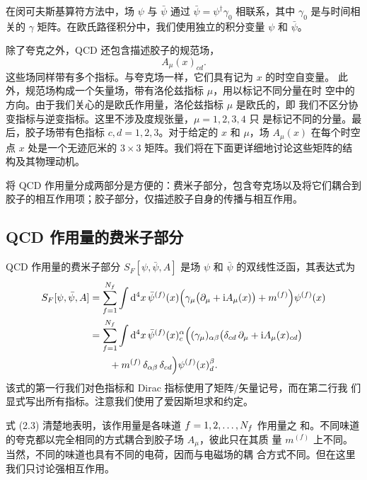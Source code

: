 在闵可夫斯基算符方法中，场 $\psi$ 与 $\bar\psi$ 通过
$\bar\psi = \psi^\dagger \gamma_0$ 相联系，其中 $\gamma_0$ 是与时间相关的
$\gamma$ 矩阵。在欧氏路径积分中，我们使用独立的积分变量 $\psi$ 和
$\bar\psi$。

除了夸克之外，QCD 还包含描述胶子的规范场，
\begin{equation}
  A_\mu(x)_{cd} .
\end{equation}
这些场同样带有多个指标。与夸克场一样，它们具有记为 $x$ 的时空自变量。
此外，规范场构成一个矢量场，带有洛伦兹指标 $\mu$，用以标记不同分量在时
空中的方向。由于我们关心的是欧氏作用量，洛伦兹指标 $\mu$ 是欧氏的，即
我们不区分协变指标与逆变指标。这里不涉及度规张量，$\mu = 1, 2, 3, 4$ 只
是标记不同的分量。最后，胶子场带有色指标 $c, d = 1, 2, 3$。对于给定的
$x$ 和 $\mu$，场 $A_\mu(x)$ 在每个时空点 $x$ 处是一个无迹厄米的 $3 \times
3$ 矩阵。我们将在下面更详细地讨论这些矩阵的结构及其物理动机。

将 QCD 作用量分成两部分是方便的：费米子部分，包含夸克场以及将它们耦合到
胶子的相互作用项；胶子部分，仅描述胶子自身的传播与相互作用。

\subsection{QCD 作用量的费米子部分}

QCD 作用量的费米子部分 $S_F[\psi, \bar\psi, A]$ 是场 $\psi$ 和 $\bar\psi$
的双线性泛函，其表达式为
\begin{equation}
  \begin{split}
    S_F[\psi, \bar\psi, A] &=
      \sum_{f=1}^{N_f} \int \mathrm{d}^4 x\,
      \bar\psi^{(f)}(x) \Big(\gamma_\mu \big(\partial_\mu
        + \mathrm{i} A_\mu(x)\big) + m^{(f)}\Big) \psi^{(f)}(x) \\
    &= \sum_{f=1}^{N_f} \int \mathrm{d}^4 x\,
      \bar\psi^{(f)}(x)^\alpha_c \Big( (\gamma_\mu)_{\alpha\beta}
      \big(\delta_{cd}\,\partial_\mu + \mathrm{i} A_\mu(x)_{cd}\big)\\
    &\qquad + m^{(f)}\,\delta_{\alpha\beta}\,\delta_{cd}\Big)
      \psi^{(f)}(x)^\beta_d .
  \end{split}
\end{equation}
该式的第一行我们对色指标和 Dirac 指标使用了矩阵/矢量记号，而在第二行我
们显式写出所有指标。注意我们使用了爱因斯坦求和约定。

式 (2.3) 清楚地表明，该作用量是各味道 $f = 1, 2, \ldots, N_f$ 作用量之
和。不同味道的夸克都以完全相同的方式耦合到胶子场 $A_\mu$，彼此只在其质
量 $m^{(f)}$ 上不同。当然，不同的味道也具有不同的电荷，因而与电磁场的耦
合方式不同。但在这里我们只讨论强相互作用。


